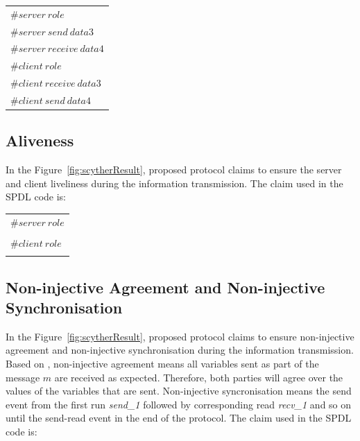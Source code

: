 \begin{table}[H]
	\begin{center}
		\begin{tabular}{l}
			\hline
			$\# server\ role$\\
			\boldmath{$claim(Server,Secret,data3)$} $\# server\ send\ data3$ \\
			\boldmath{$claim(Server,Secret,data4)$} $\# server\ receive\ data4$ \\
			$\# client\ role$\\
			\boldmath{$claim(Client,Secret,data3)$} $\# client\ receive\ data3$ \\
			\boldmath{$claim(Client,Secret,data4)$} $\# client\ send\ data4$ \\
			\hline
		\end{tabular}
	\end{center}
\end{table}

\subsection{Aliveness}

In the Figure~\ref{fig:scytherResult}, proposed protocol claims to ensure the server and client liveliness during the information transmission. The claim used in the SPDL code is:

\begin{table}[H]
	\begin{center}
		\begin{tabular}{l}
			\hline
			$\# server\ role$\\
			\boldmath{$claim(Server,Alive)$}\\
			$\# client\ role$\\
			\boldmath{$claim(Client,Alive)$} \\
			\hline
		\end{tabular}
	\end{center}
\end{table}

\subsection{Non-injective Agreement and Non-injective Synchronisation}

In the Figure~\ref{fig:scytherResult}, proposed protocol claims to ensure non-injective agreement and non-injective synchronisation during the information transmission. Based on \cite{nisyncandnyaggre}, non-injective agreement means all variables sent as part of the message $m$ are received as expected. Therefore, both parties will agree over the values of the variables that are sent. Non-injective syncronisation means the send event from the first run \textit{send\_1} followed by corresponding read \textit{recv\_1} and so on until the send-read event in the end of the protocol. The claim used in the SPDL code is:

